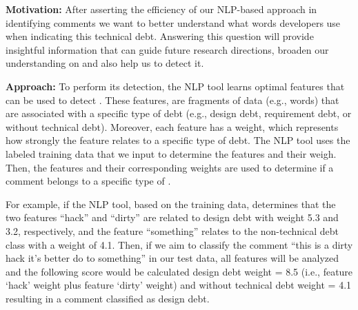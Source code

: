 
\vspace{3mm}
\noindent\rqii
\vspace{3mm}

\noindent \textbf{Motivation:} After asserting the efficiency of our NLP-based approach in identifying \SATD comments we want to better understand what words developers use when indicating this technical debt. Answering this question will provide insightful information that can guide future research directions, broaden our understanding on \SATD and also help us to detect it.     

\vspace{1mm}
\noindent \textbf{Approach:} To perform its detection, the NLP tool learns optimal features that can be used to detect \SATD. These features, are fragments of data (e.g., words) that are associated with a specific type of debt (e.g., design debt, requirement debt, or without technical debt). Moreover, each feature has a weight, which represents how strongly the feature relates to a specific type of debt. The NLP tool uses the labeled training data that we input to determine the features and their weigh. Then, the features and their corresponding weights are used to determine if a comment belongs to a specific type of \SATD.

For example, if the NLP tool, based on the training data, determines that the two features ``hack'' and ``dirty'' are related to design debt with weight 5.3 and 3.2, respectively, and the feature ``something'' relates to the non-technical debt class with a weight of 4.1. Then, if we aim to classify the comment ``this is a dirty hack it's better do to something'' in our test data, all features will be analyzed and the following score would be calculated design debt weight = 8.5 (i.e., feature `hack' weight plus feature `dirty' weight) and without technical debt weight = 4.1 resulting in a comment classified as design debt.


